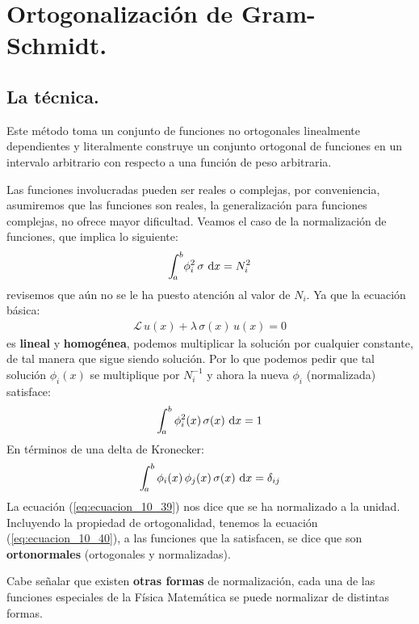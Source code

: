 \documentclass[12pt]{article}
\def\scaleint#1{\vcenter{\hbox{\scaleto[3ex]{\displaystyle\int}{#1}}}}
\def\bs{\mkern-12mu}
\numberwithin{equation}{section}
\begin{document}
\section{Ortogonalización de Gram-Schmidt.}
\subsection{La técnica.}

Este método toma un conjunto de funciones no ortogonales linealmente dependientes y literalmente construye un conjunto ortogonal de funciones en un intervalo arbitrario con respecto a una función de peso arbitraria.
\par
Las funciones involucradas pueden ser reales o complejas, por conveniencia, asumiremos que las funciones son reales, la generalización para funciones complejas, no ofrece mayor dificultad. Veamos el caso de la normalización de funciones, que implica lo siguiente:
\begin{align*}
\scaleint{5ex}_{\bs a}^{b} \phi_{i}^{2} \, \sigma  \, \dd{x}  =  N_{i}^{2}
\end{align*}
revisemos que aún no se le ha puesto atención al valor de $N_{i}$. Ya que la ecuación básica:
\begin{align}
\mathcal{L} \, u (x) + \lambda \, \sigma (x) \, u (x) = 0
\label{eq:ecuacion_10_08}
\end{align}
es \textbf{lineal} y \textbf{homogénea}, podemos multiplicar la solución por cualquier constante, de tal manera que sigue siendo solución. Por lo que podemos pedir que tal solución $\phi_{i}(x)$ se multiplique por $N_{i}^{-1}$  y ahora la nueva $\phi_{i}$ (normalizada) satisface:
\begin{align}
\scaleint{5ex}_{\bs a}^{b} \, \phi_{i}^{2} (x) \, \sigma(x) \, \dd{x} = 1
\label{eq:ecuacion_10_39}
\end{align}
En términos de una delta de Kronecker:
\begin{align}
\scaleint{5ex}_{\bs a}^{b} \, \phi_{i}(x) \, \phi_{j} (x) \, \sigma (x) \, \dd{x} = \delta_{ij}
\label{eq:ecuacion_10_40}
\end{align}
La ecuación (\ref{eq:ecuacion_10_39}) nos dice que se ha normalizado a la unidad. Incluyendo la propiedad de ortogonalidad, tenemos la ecuación (\ref{eq:ecuacion_10_40}), a las funciones que la satisfacen, se dice que son \textbf{ortonormales} (ortogonales y normalizadas).
\par
Cabe señalar que existen \textbf{otras formas} de normalización,  cada una de las funciones especiales de la Física Matemática se puede normalizar de distintas formas.
\end{document}
